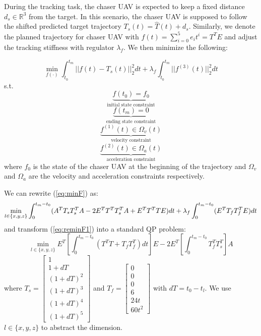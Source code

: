 During the tracking task, the chaser UAV is expected to keep a fixed distance $d_s\in\mathbb{R}^{3}$ from the target. In this scenario, the chaser UAV is supposed to follow the shifted predicted target trajectory $T_s(t)=\hat{T}(t)+d_s$. Similarly, we denote the planned trajectory for chaser UAV with $f(t)=\sum^5_{i=0} e_{i}t^i=T^TE$ and adjust the tracking stiffness with regulator $\lambda_f$. We then minimize the following:

\begin{equation}\label{eq:minF}
\min_{f(\cdot)} \int_{t_0}^{t_m} ||f(t)-T_s(t)||^2_{2}dt + \lambda_f\int_{t_0}^{t_m} ||f^{(3)}(t)||^2_{2}dt
\end{equation}
\indent s.t.
\begin{equation}
\underbrace{f(t_0)=f_0}_{\text{initial state constraint}}
\end{equation}
\begin{equation}
\underbrace{f(t_m)=0}_{\text{ending state constraint}}
\end{equation}
\begin{equation}
\underbrace{f^{(1)}(t) \in \Omega_{v}(t)}_{\text{velocity constraint}}
\end{equation}
\begin{equation}
\underbrace{f^{(2)}(t) \in \Omega_{a}(t)}_{\text{acceleration constraint}}
\end{equation}
\noindent
where $f_0$ is the state of the chaser UAV at the beginning of the trajectory and $\Omega_v$ and $\Omega_a$ are the velocity and acceleration constraints respectively.

We can rewrite (\ref{eq:minF}) as:
\begin{equation}\label{eq:reminF1}
\min_{l\in\{x,y,z\}}\int_{0}^{t_m-t_0} (A^TT_sT_s^TA-2E^TT^TT_s^TA+E^TT^TTE)dt + \lambda_f\int_{0}^{t_m-t_0} (E^TT_fT_f^TE)dt\\
\end{equation}
\noindent
and transform (\ref{eq:reminF1}) into a standard QP problem:
\begin{equation}\label{eq:reminF2}
\min_{l\in\{x,y,z\}}E^T[\int_{0}^{t_m-t_0}(T^TT+T_fT_f^T)dt]E-2E^T[\int_{0}^{t_m-t_0}T_f^TT_s^T]A
\end{equation}
\noindent
where $T_s = \begin{bmatrix}1\\1+dT\\(1+dT)^2\\(1+dT)^3\\(1+dT)^4\\(1+dT)^5\end{bmatrix}$ and $T_f=\begin{bmatrix}0\\0\\0\\6\\24t\\60t^2\end{bmatrix}$ with $dT=t_0-t_l$. We use $l\in\{x,y,z\}$ to abstract the dimension.


